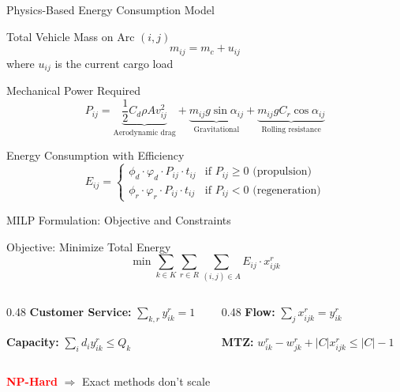 \documentclass[aspectratio=169,11pt]{beamer}
\begin{document}
\begin{frame}{Physics-Based Energy Consumption Model}
    \begin{block}{Total Vehicle Mass on Arc $(i,j)$}
        \[
        m_{ij} = m_c + u_{ij}
        \]
        where $u_{ij}$ is the current cargo load
    \end{block}
    
    \begin{block}{Mechanical Power Required}
        \[
        P_{ij} = \underbrace{\frac{1}{2} C_d \rho A v_{ij}^2}_{\text{Aerodynamic drag}} + 
                 \underbrace{m_{ij} g \sin\alpha_{ij}}_{\text{Gravitational}} + 
                 \underbrace{m_{ij} g C_r \cos\alpha_{ij}}_{\text{Rolling resistance}}
        \]
    \end{block}
    
    \begin{block}{Energy Consumption with Efficiency}
        \[
        E_{ij} = \begin{cases}
            \phi_d \cdot \varphi_d \cdot P_{ij} \cdot t_{ij} & \text{if } P_{ij} \geq 0 \text{ (propulsion)} \\[0.2cm]
            \phi_r \cdot \varphi_r \cdot P_{ij} \cdot t_{ij} & \text{if } P_{ij} < 0 \text{ (regeneration)}
        \end{cases}
        \]
    \end{block}
\end{frame}

\begin{frame}{MILP Formulation: Objective and Constraints}
    \begin{block}{Objective: Minimize Total Energy}
        \vspace{-0.2cm}
        \[
        \min \sum_{k \in K} \sum_{r \in R} \sum_{(i,j) \in A} E_{ij} \cdot x_{ijk}^r
        \]
        \vspace{-0.4cm}
    \end{block}

    \begin{columns}[T]
        \begin{column}{0.48\textwidth}
            \small
            \textbf{Customer Service:} $\sum_{k,r} y_{ik}^r = 1$

            \textbf{Capacity:} $\sum_{i} d_i y_{ik}^r \leq Q_k$
        \end{column}
        \begin{column}{0.48\textwidth}
            \small
            \textbf{Flow:} $\sum_j x_{ijk}^r = y_{ik}^r$

            \textbf{MTZ:} $w_{ik}^r - w_{jk}^r + |C| x_{ijk}^r \leq |C| - 1$
        \end{column}
    \end{columns}

    \vspace{0.2cm}
    \begin{center}
        \textcolor{red}{\textbf{NP-Hard}} $\Rightarrow$ Exact methods don't scale
    \end{center}
\end{frame}
\end{document}
